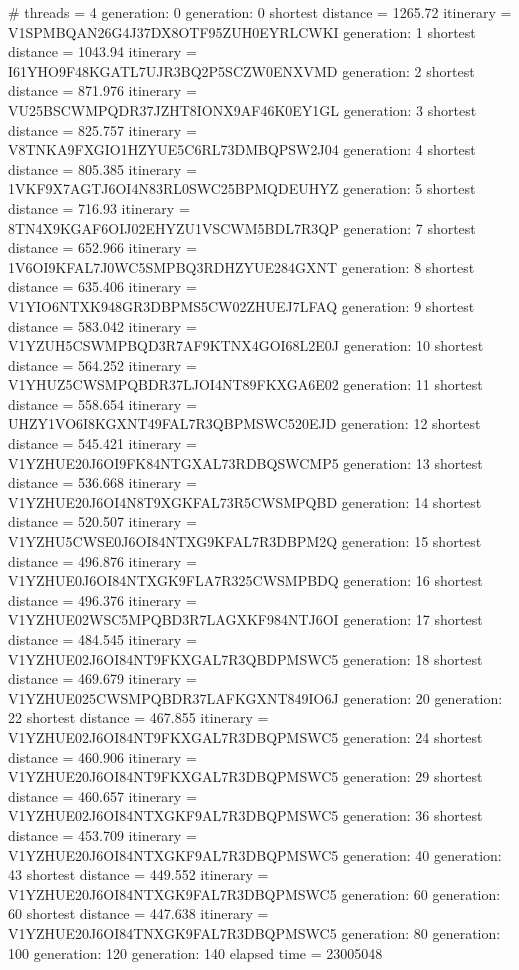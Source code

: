 \documentclass[11pt, letterpaper]{article}
\begin{document}
\begin{small}
		
		\noindent \# threads = 4 \newline
		generation: 0 \newline
		generation: 0 shortest distance = 1265.72	 itinerary = V1SPMBQAN26G4J37DX8OTF95ZUH0EYRLCWKI
		generation: 1 shortest distance = 1043.94	 itinerary = I61YHO9F48KGATL7UJR3BQ2P5SCZW0ENXVMD
		generation: 2 shortest distance = 871.976	 itinerary = VU25BSCWMPQDR37JZHT8IONX9AF46K0EY1GL
		generation: 3 shortest distance = 825.757	 itinerary = V8TNKA9FXGIO1HZYUE5C6RL73DMBQPSW2J04
		generation: 4 shortest distance = 805.385	 itinerary = 1VKF9X7AGTJ6OI4N83RL0SWC25BPMQDEUHYZ
		generation: 5 shortest distance = 716.93	 itinerary = 8TN4X9KGAF6OIJ02EHYZU1VSCWM5BDL7R3QP
		generation: 7 shortest distance = 652.966	 itinerary = 1V6OI9KFAL7J0WC5SMPBQ3RDHZYUE284GXNT
		generation: 8 shortest distance = 635.406	 itinerary = V1YIO6NTXK948GR3DBPMS5CW02ZHUEJ7LFAQ
		generation: 9 shortest distance = 583.042	 itinerary = V1YZUH5CSWMPBQD3R7AF9KTNX4GOI68L2E0J
		generation: 10 shortest distance = 564.252	 itinerary = V1YHUZ5CWSMPQBDR37LJOI4NT89FKXGA6E02
		generation: 11 shortest distance = 558.654	 itinerary = UHZY1VO6I8KGXNT49FAL7R3QBPMSWC520EJD
		generation: 12 shortest distance = 545.421	 itinerary = V1YZHUE20J6OI9FK84NTGXAL73RDBQSWCMP5
		generation: 13 shortest distance = 536.668	 itinerary = V1YZHUE20J6OI4N8T9XGKFAL73R5CWSMPQBD
		generation: 14 shortest distance = 520.507	 itinerary = V1YZHU5CWSE0J6OI84NTXG9KFAL7R3DBPM2Q
		generation: 15 shortest distance = 496.876	 itinerary = V1YZHUE0J6OI84NTXGK9FLA7R325CWSMPBDQ
		generation: 16 shortest distance = 496.376	 itinerary = V1YZHUE02WSC5MPQBD3R7LAGXKF984NTJ6OI
		generation: 17 shortest distance = 484.545	 itinerary = V1YZHUE02J6OI84NT9FKXGAL7R3QBDPMSWC5
		generation: 18 shortest distance = 469.679	 itinerary = V1YZHUE025CWSMPQBDR37LAFKGXNT849IO6J
		generation: 20\newline
		generation: 22 shortest distance = 467.855	 itinerary = V1YZHUE02J6OI84NT9FKXGAL7R3DBQPMSWC5
		generation: 24 shortest distance = 460.906	 itinerary = V1YZHUE20J6OI84NT9FKXGAL7R3DBQPMSWC5
		generation: 29 shortest distance = 460.657	 itinerary = V1YZHUE02J6OI84NTXGKF9AL7R3DBQPMSWC5
		generation: 36 shortest distance = 453.709	 itinerary = V1YZHUE20J6OI84NTXGKF9AL7R3DBQPMSWC5
		generation: 40\newline
		generation: 43 shortest distance = 449.552	 itinerary = V1YZHUE20J6OI84NTXGK9FAL7R3DBQPMSWC5
		generation: 60\newline
		generation: 60 shortest distance = 447.638	 itinerary = V1YZHUE20J6OI84TNXGK9FAL7R3DBQPMSWC5
		generation: 80\newline
		generation: 100\newline
		generation: 120\newline
		generation: 140\newline
		elapsed time = 23005048
	\end{small}
	
\end{document}
